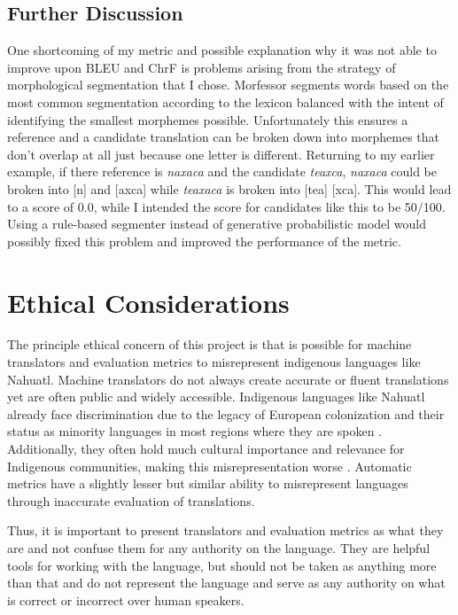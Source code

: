 \documentclass[10pt,twocolumn]{article}
\begin{document}
\subsection{Further Discussion}
One shortcoming of my metric and possible explanation why it was not able to improve upon BLEU and ChrF is problems arising from the strategy of morphological segmentation that I chose. Morfessor segments words based on the most common segmentation according to the lexicon balanced with the intent of identifying the smallest morphemes possible. Unfortunately this ensures a reference and a candidate translation can be broken down into morphemes that don't overlap at all just because one letter is different. Returning to my earlier example, if there reference is \textit{naxaca} and the candidate \textit{teaxca}, \textit{naxaca} could be broken into [n] and [axca] while \textit{teaxaca} is broken into [tea] [xca]. This would lead to a score of 0.0, while I intended the score for candidates like this to be 50/100. Using a rule-based segmenter instead of generative probabilistic model would possibly fixed this problem and improved the performance of the metric.

\section{Ethical Considerations}

The principle ethical concern of this project is that is possible for machine translators and evaluation metrics to misrepresent indigenous languages like Nahuatl. Machine translators do not always create accurate or fluent translations yet are often public and widely accessible. Indigenous languages like Nahuatl already face discrimination due to the legacy of European colonization and their status as minority languages in most regions where they are spoken \cite{IndigenousLanguageDeath}. Additionally, they often hold much cultural importance and relevance for Indigenous communities, making this misrepresentation worse \cite{IndigenousLanguages}. Automatic metrics have a slightly lesser but similar ability to misrepresent languages through inaccurate evaluation of translations. 

Thus, it is important to present translators and evaluation metrics as what they are and not confuse them for any authority on the language. They are helpful tools for working with the language, but should not be taken as anything more than that and do not represent the language and serve as any authority on what is correct or incorrect over human speakers. 
\end{document}
